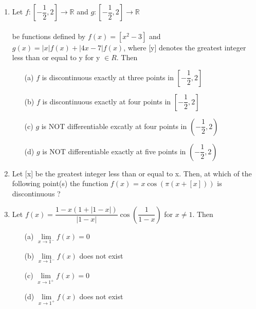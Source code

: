 \begin{enumerate}[label=\arabic*.,ref=\thesubsection.\theenumi]
\item Let $f:\left[-\dfrac{1}{2},2\right] \to \mathbb{R}$ and $g:\left[-\dfrac{1}{2},2\right] \to \mathbb{R}$\\
\\ be functions defined by $f(x)=[x^2-3]$ and $g(x)=|x|f(x)+|4x-7|f(x)$, where [y] denotes the greatest integer less than or equal to y for y $\in R$. Then
\begin{itemize}
\item[(a)] $f$ is discontinuous exactly at three points in $\left[-\dfrac{1}{2},2\right]$\\
\item[(b)] $f$ is discontinuous exactly at four points in $\left[-\dfrac{1}{2},2\right]$\\
\item[(c)] $g$ is NOT differentiable excatly at four points in $\left(-\dfrac{1}{2},2\right)$\\
\item[(d)] $g$ is NOT differentiable exactly at five points in $\left(-\dfrac{1}{2},2\right)$\\
\end{itemize}

\item Let [x] be the greatest integer less than or equal to x. Then, at which of the following point(s) the function $f(x)$ = $x\cos(\pi(x+[x]))$ is discontinuous ?
\begin{itemize}
\end{itemize}

\item Let \resizebox{.33 \textwidth}{!} 
{$f(x)=\dfrac{1-x(1+|1-x|)}{|1-x|}\cos\left(\dfrac{1}{1-x}\right)$} for $x\neq 1$. Then
\begin{itemize}
\item[(a)] $\lim\limits_{x \to 1^-}f(x)=0$\\
\item[(b)] $\lim\limits_{x \to 1^-}f(x)$ does not exist\\
\item[(c)] $\lim\limits_{x \to 1^+}f(x)=0$\\
\item[(d)] $\lim\limits_{x \to 1^+}f(x)$ does not exist\\
\end{itemize}


\end{enumerate}
